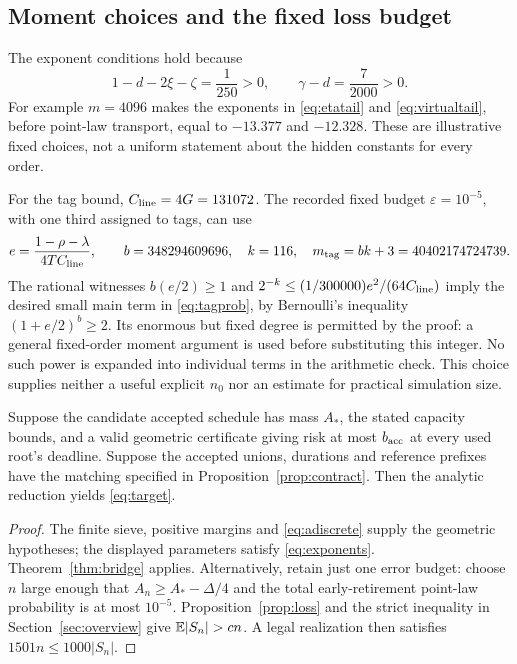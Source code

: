 \subsection{Moment choices and the fixed loss budget}
The exponent conditions hold because
\[
 1-d-2\xi-\zeta=\frac1{250}>0,\qquad
 \gamma-d=\frac7{2000}>0.
\]
For example \(m=4096\) makes the exponents in
\eqref{eq:etatail} and \eqref{eq:virtualtail}, before point-law
transport, equal to \(-13.377\) and \(-12.328\).
These are illustrative fixed choices, not a uniform statement about
the hidden constants for every order.

For the tag bound, \(C_{\rm line}=4G=131072\). The recorded fixed
budget \(\varepsilon=10^{-5}\), with one third assigned to tags,
can use
\[
 e=\frac{1-\rho-\lambda}{4TC_{\rm line}},\qquad
 b=348294609696,\quad k=116,\quad
 m_{\rm tag}=bk+3=40402174724739.
\]
The rational witnesses
\(b(e/2)\ge1\) and
\(2^{-k}\le (1/300000)e^2/(64C_{\rm line})\) imply the desired
small main term in \eqref{eq:tagprob}, by Bernoulli's inequality
\((1+e/2)^b\ge2\). Its enormous but fixed degree is permitted by
the proof: a general fixed-order moment argument is used before
substituting this integer. No such power is expanded into individual
terms in the arithmetic check. This choice supplies neither a useful
explicit \(n_0\) nor an estimate for practical simulation size.

\begin{corollary}\label{cor:target}
Suppose the candidate accepted schedule has mass \(A_*\), the stated
capacity bounds, and a valid geometric certificate giving risk at
most \(b_{\rm acc}\) at every used root's deadline. Suppose the
accepted unions, durations and reference prefixes have the matching
specified in Proposition~\ref{prop:contract}. Then the analytic
reduction yields \eqref{eq:target}.
\end{corollary}
\begin{proof}
The finite sieve, positive margins and \eqref{eq:adiscrete} supply
the geometric hypotheses; the displayed parameters satisfy
\eqref{eq:exponents}. Theorem~\ref{thm:bridge} applies.
Alternatively, retain just one error budget: choose \(n\) large
enough that \(A_n\ge A_*-\Delta/4\) and the total early-retirement
point-law probability is at most \(10^{-5}\). Proposition~\ref{prop:loss}
and the strict inequality in Section~\ref{sec:overview} give
\(\E|S_n|>cn\). A legal realization then satisfies
\(1501n\le1000|S_n|\).
\end{proof}

